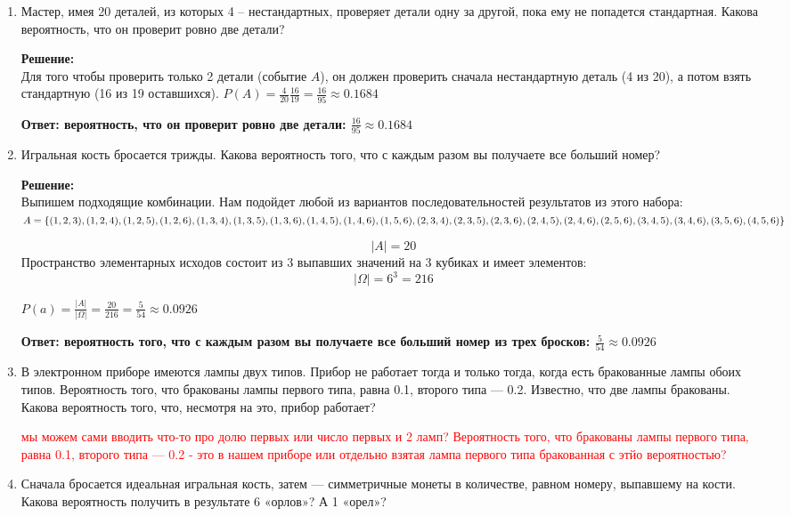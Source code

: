 \documentclass[a4paper,12pt]{article}
\begin{document}
\begin{enumerate}
\item Мастер, имея 20 деталей, из которых 4 – нестандартных, проверяет детали одну за другой, пока ему не попадется стандартная. Какова вероятность, что он проверит ровно две детали? 

\textbf{Решение:}\\
Для того чтобы проверить только 2 детали (событие $A$), он должен проверить сначала нестандартную деталь (4 из 20), а потом взять стандартную (16 из 19 оставшихся). $P(A) =  \frac{4}{20} \frac{16}{19}=\frac{16}{95}\approx0.1684$ 

\textbf{Ответ: вероятность, что он проверит ровно две детали: $\frac{16}{95}\approx0.1684$}

\item Игральная кость бросается трижды. Какова вероятность того, что с каждым разом вы получаете все больший номер? 

\textbf{Решение:}\\
Выпишем подходящие комбинации.
Нам подойдет любой из вариантов последовательностей результатов из этого набора: \\
$A = \{(1,2,3), (1,2,4), (1,2,5), (1,2,6), (1,3,4), (1,3,5), (1,3,6), (1,4,5), (1,4,6), (1,5,6), \\(2,3,4), (2,3,5), (2,3,6), (2,4,5), (2,4,6), (2,5,6), (3,4,5), (3,4,6), (3,5,6), (4,5,6)\}$

$$|A| = 20$$
Пространство элементарных исходов состоит из 3 выпавших значений на 3 кубиках и имеет элементов:
$$|\Omega|=6^3=216$$

$P(a) = \frac{|A|}{|\Omega|}=\frac{20}{216}=\frac{5}{54}\approx0.0926$

\textbf{Ответ: вероятность того, что с каждым разом вы получаете все больший номер из трех бросков: $\frac{5}{54}\approx0.0926$}


\item В электронном приборе имеются лампы двух типов. Прибор не работает тогда и только тогда, когда есть бракованные лампы обоих типов. Вероятность того, что бракованы лампы первого типа, равна 0.1, второго типа — 0.2. Известно, что две лампы бракованы. Какова вероятность того, что, несмотря на это, прибор работает?

\textcolor{red}{мы можем сами вводить что-то про долю первых или число первых и 2 ламп? Вероятность того, что бракованы лампы первого типа, равна 0.1, второго типа — 0.2 - это в нашем приборе или отдельно взятая лампа первого типа бракованная с этйо вероятностью?}

\item Сначала бросается идеальная игральная кость, затем — симметричные монеты в количестве, равном номеру, выпавшему на кости. Какова вероятность получить в результате 6 «орлов»? А 1 «орел»? 


\end{enumerate}
\end{document}
